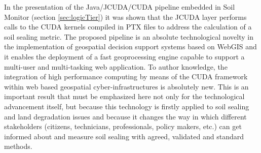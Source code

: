 \documentclass[APA,LATO1COL,doublespace]{WileyNJD-v2}
\newcommand{\toberevised}[1]{\emph{\textcolor{red}{#1}}} %
\begin{document}
In the presentation of the Java/JCUDA/CUDA pipeline embedded in Soil Monitor (section \ref{sec:logicTier}) 
it was shown that the JCUDA layer performs calls to the CUDA kernels compiled in PTX files to address the calculation of a soil sealing metric.
The proposed pipeline is an absolute technological novelty in the implementation of geospatial decision support systems based on WebGIS and it enables the deployment of a fast geoprocessing engine capable to support a multi-user and multi-tasking web application.
To author knowledge, the
integration of high performance computing by means of the CUDA framework within web based geospatial cyber-infrastructures is absolutely new.
This is an important result that must be emphasized here not only for the technological advancement itself, but because this technology is firstly applied to soil sealing and land degradation issues and because it changes the way in which different stakeholders (citizens, technicians, professionals, policy makers, etc.) can get informed about and measure soil sealing with agreed, validated and standard methods.
\end{document}
